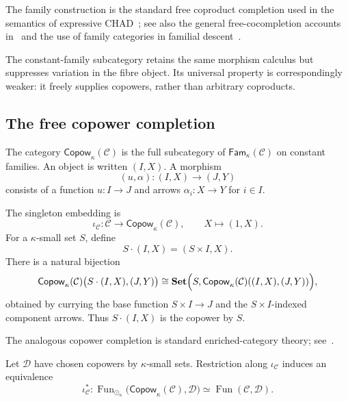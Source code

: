 \documentclass[runningheads,envcountsame]{llncs}
\newcommand{\Set}{\mathbf{Set}}
\newcommand{\Copow}{\mathsf{Copow}}
\newcommand{\Fam}{\mathsf{Fam}}
\begin{document}
The family construction is the standard free coproduct completion used in the semantics of expressive CHAD~\cite{LucatelliNunesVakar2023}; see also the general free-cocompletion accounts in~\cite{Kelly1982,AdamekRosicky2020} and the use of family categories in familial descent~\cite{Prezado2024}.

The constant-family subcategory retains the same morphism calculus but suppresses variation in the fibre object. Its universal property is correspondingly weaker: it freely supplies copowers, rather than arbitrary coproducts.

\subsection{The free copower completion}

\begin{definition}
\label{def:copow-app}
The category $\Copow_\kappa(\mathcal C)$ is the full subcategory of $\Fam_\kappa(\mathcal C)$ on constant families. An object is written $(I,X)$. A morphism
$$
(u,\alpha):(I,X)\longrightarrow(J,Y)
$$
consists of a function $u:I\to J$ and arrows $\alpha_i:X\to Y$ for $i\in I$.
\end{definition}

The singleton embedding is
$$
\iota_\mathcal C:\mathcal C\longrightarrow\Copow_\kappa(\mathcal C),
\qquad
X\longmapsto(1,X).
$$
For a $\kappa$-small set $S$, define
$$
S\cdot(I,X)=(S\times I,X).
$$
There is a natural bijection
$$
\Copow_\kappa(\mathcal C)
\bigl(S\cdot(I,X),(J,Y)\bigr)
\cong
\Set\Bigl(S,\Copow_\kappa(\mathcal C)((I,X),(J,Y))\Bigr),
$$
obtained by currying the base function $S\times I\to J$ and the $S\times I$-indexed component arrows. Thus $S\cdot(I,X)$ is the copower by $S$.

The analogous copower completion is standard enriched-category theory; see~\cite[Sections~3.7 and~4.1]{Kelly1982}.

\begin{theorem}
\label{thm:copow-up-app}
Let $\mathcal D$ have chosen copowers by $\kappa$-small sets. Restriction along $\iota_\mathcal C$ induces an equivalence
$$
\iota_\mathcal C^*:
\operatorname{Fun}_{\odot_\kappa}
\bigl(\Copow_\kappa(\mathcal C),\mathcal D\bigr)
\simeq
\operatorname{Fun}(\mathcal C,\mathcal D).
$$
\end{theorem}
\end{document}

